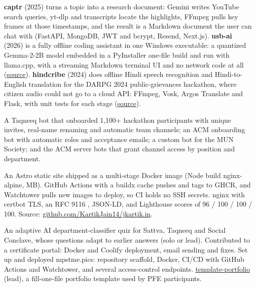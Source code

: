 \textbf{captr} (2025) turns a topic into a research document: Gemini writes YouTube search queries,
yt-dlp and transcripts locate the highlights, FFmpeg pulls key frames at those timestamps, and the
result is a Markdown document the user can chat with (FastAPI, MongoDB, JWT and bcrypt, Resend,
Next.js). \textbf{usb-ai} (2026) is a fully offline coding assistant in one Windows executable: a
quantized Gemma-2-2B model embedded in a PyInstaller one-file build and run with llama.cpp, with a
streaming Markdown terminal UI and no network code at all
(\href{https://github.com/KartikJain14/usb-ai}{source}). \textbf{hindcribe} (2024) does offline
Hindi speech recognition and Hindi-to-English translation for the DARPG 2024 public-grievances
hackathon, where citizen audio could not go to a cloud API: FFmpeg, Vosk, Argos Translate and Flask,
with unit tests for each stage (\href{https://github.com/KartikJain14/hindcribe}{source}).

A Taqneeq bot that onboarded 1,100+ hackathon participants with unique invites, real-name renaming
and automatic team channels; an ACM onboarding bot with automatic roles and acceptance emails; a
custom bot for the MUN Society; and the ACM server bots that grant channel access by position and
department.

An Astro static site shipped as a multi-stage Docker image (Node build \arr nginx-alpine,
 MB). GitHub Actions with a buildx cache pushes  and  tags to GHCR,
and Watchtower pulls new images to deploy, so CI holds no SSH secrets. nginx with certbot TLS, an
RFC 9116 , JSON-LD, and Lighthouse scores of 96 / 100 / 100 / 100.
Source: \href{https://github.com/KartikJain14/jkartik.in}{github.com/KartikJain14/jkartik.in}.

An adaptive AI department-classifier quiz for Sattva, Taqneeq and Social Conclave, whose questions
adapt to earlier answers (solo or lead). Contributed to a certificate portal: Docker and Coolify
deployment, email sending and fixes. Set up and deployed mpstme.pics: repository scaffold, Docker,
CI/CD with GitHub Actions and Watchtower, and several access-control endpoints.
\href{https://github.com/KartikJain14/template-portfolio}{template-portfolio} (lead), a fill-one-file
portfolio template used by PFE participants.
